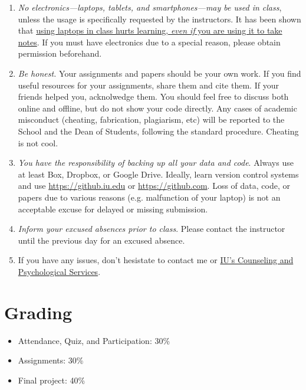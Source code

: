 \documentclass[11pt,article,oneside]{memoir} %
\begin{document}
\begin{enumerate}
\item \emph{No electronics---laptops, tablets, and smartphones---may be used in
class}, unless the usage is specifically requested by the instructors.  It has
been shown that
\href{http://www.scientificamerican.com/article/a-learning-secret-don-t-take-notes-with-a-laptop/}{using
laptops in class hurts learning, \emph{even if} you are using it to take
notes}.  If you must have electronics due to a special reason, please obtain
permission beforehand. 

\item \emph{Be honest.} Your assignments and papers should be your own work.
If you find useful resources for your assignments, share them and cite them. If
your friends helped you, acknolwedge them. You should feel free to discuss both
online and offline, but do not show your code directly.  Any cases of academic
misconduct (cheating, fabrication, plagiarism, etc) will be reported to the
School and the Dean of Students, following the standard procedure. Cheating is
not cool. 

\item \emph{You have the responsibility of backing up all your data and code}.
Always use at least Box, Dropbox, or Google Drive. Ideally, learn version
control systems and use \url{https://github.iu.edu} or
\url{https://github.com}. Loss of data, code, or papers due to various reasons
(e.g. malfunction of your laptop) is not an acceptable excuse for delayed or
missing submission. 

\item \emph{Inform your excused absences prior to class}. Please contact the
instructor until the previous day for an excused absence.  

\item If you have any issues, don't hesistate to contact me or
\href{http://healthcenter.indiana.edu/counseling/index.shtml}{IU's Counseling
and Psychological Services}. 


\end{enumerate}%
\section{Grading}%
\label{sec:grading_tentative_}

\begin{itemize}%

\item Attendance, Quiz, and Participation: 30\%

\item Assignments: 30\%

\item Final project: 40\%

\end{itemize}%
\end{document}
